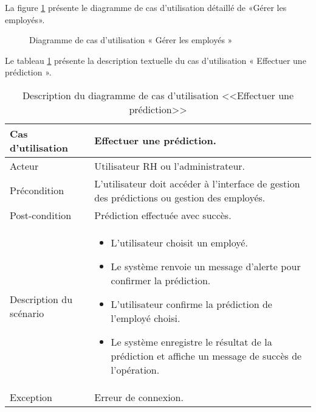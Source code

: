 \newpage
La figure \ref{fig:useCaseSprint2_2} présente le diagramme de cas d’utilisation détaillé de «Gérer les employés».
\begin{figure}[htpb]
    \centering
    \caption{Diagramme de cas d’utilisation « Gérer les employés »}
    \label{fig:useCaseSprint2_2}
    \end{figure}
\newline Le tableau \ref{tab:Effectueruneprediction} présente la description textuelle du cas d’utilisation « Effectuer une prédiction ».
\begin{longtable}[c]{
    |p{}
    |p{}|
}
    \caption{Description du diagramme de cas d’utilisation <<Effectuer une prédiction>>}
    \label{tab:Effectueruneprediction}\\
    \hline
    
    Cas d’utilisation
    & Effectuer une prédiction. \\
    \hline 
    
    Acteur
    & Utilisateur RH ou l'administrateur. \\
    \hline 
    
    Précondition
    & L'utilisateur doit accéder à l'interface de gestion des prédictions ou gestion des employés. \\
    \hline
    
    Post-condition
    & Prédiction effectuée avec succès. \\
    \hline
    
    Description du
scénario

    &     \begin{itemize}
    \item L’utilisateur choisit un employé.
    \item Le système renvoie un message d'alerte pour confirmer la prédiction.
     \item L'utilisateur confirme la prédiction de l'employé choisi.
     \item Le système enregistre le résultat de la prédiction et affiche un message de succès de l'opération.

    \end{itemize} \\
    \hline
    
   Exception
    & Erreur de connexion.
 \\ \hline
   
\end{longtable}





